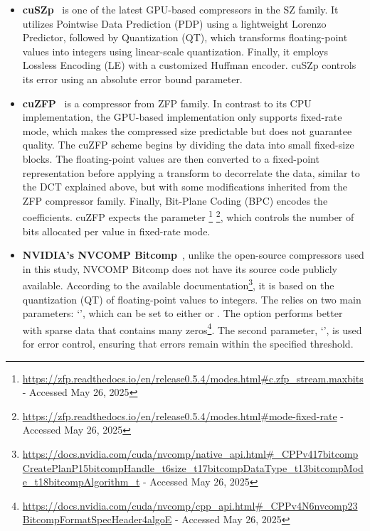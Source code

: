 \documentclass[Ingles]{ic-tese-v3}
\begin{document}
\begin{itemize}
    \item \textbf{cuSZp}~\cite{cuszp} is one of the latest GPU-based compressors in the SZ family. It utilizes Pointwise Data Prediction (PDP) using a lightweight Lorenzo Predictor, followed by Quantization (QT), which transforms floating-point values into integers using linear-scale quantization. Finally, it employs Lossless Encoding (LE) with a customized Huffman encoder. cuSZp controls its error using an absolute error bound parameter.

    \item \textbf{cuZFP}~\cite{zfp} is a compressor from ZFP family. In contrast to its CPU implementation, the GPU-based implementation only supports fixed-rate mode, which makes the compressed size predictable but does not guarantee quality. The cuZFP \compression scheme begins by dividing the data into small fixed-size blocks. The floating-point values are then converted to a fixed-point representation before applying a transform to decorrelate the data, similar to the DCT explained above, but with some modifications inherited from the ZFP compressor family. Finally, Bit-Plane Coding (BPC) encodes the coefficients. cuZFP expects the parameter \footnote{\url{https://zfp.readthedocs.io/en/release0.5.4/modes.html\#c.zfp_stream.maxbits} - Accessed May 26, 2025} \footnote{\url{https://zfp.readthedocs.io/en/release0.5.4/modes.html\#mode-fixed-rate} - Accessed May 26, 2025}, which controls the number of bits allocated per value in fixed-rate mode. 

    \item \textbf{NVIDIA's NVCOMP Bitcomp}~\cite{nvcomp}, unlike the open-source compressors used in this study, NVCOMP Bitcomp does not have its source code publicly available. According to the available documentation\footnote{\url{https://docs.nvidia.com/cuda/nvcomp/native_api.html#_CPPv417bitcompCreatePlanP15bitcompHandle_t6size_t17bitcompDataType_t13bitcompMode_t18bitcompAlgorithm_t} - Accessed May 26, 2025}, it is based on the quantization (QT) of floating-point values to integers. The \compression relies on two main parameters: `', which can be set to either  or . The  option performs better with sparse data that contains many zeros\footnote{\url{https://docs.nvidia.com/cuda/nvcomp/cpp_api.html#_CPPv4N6nvcomp23BitcompFormatSpecHeader4algoE} - Accessed May 26, 2025}. The second parameter, `', is used for error control, ensuring that errors remain within the specified threshold.
\end{itemize}
\end{document}
